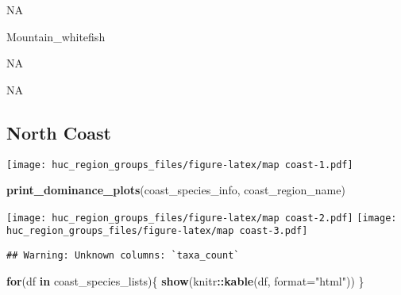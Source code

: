 \documentclass[]{article}
\newenvironment{Shaded}{\begin{snugshade}}{\end{snugshade}}
\newcommand{\KeywordTok}[1]{\textcolor[rgb]{0.13,0.29,0.53}{\textbf{#1}}}
\newcommand{\DataTypeTok}[1]{\textcolor[rgb]{0.13,0.29,0.53}{#1}}
\newcommand{\StringTok}[1]{\textcolor[rgb]{0.31,0.60,0.02}{#1}}
\newcommand{\CommentTok}[1]{\textcolor[rgb]{0.56,0.35,0.01}{\textit{#1}}}
\newcommand{\ControlFlowTok}[1]{\textcolor[rgb]{0.13,0.29,0.53}{\textbf{#1}}}
\newcommand{\OperatorTok}[1]{\textcolor[rgb]{0.81,0.36,0.00}{\textbf{#1}}}
\newcommand{\NormalTok}[1]{#1}
\begin{document}
NA

Mountain\_whitefish

NA

NA

\subsection{North Coast}\label{north-coast}

\begin{Shaded}
\end{Shaded}

\texttt{[image: huc\_region\_groups\_files/figure-latex/map coast-1.pdf]}

\begin{Shaded}
\begin{Highlighting}[]
\KeywordTok{print_dominance_plots}\NormalTok{(coast_species_info, coast_region_name)}
\end{Highlighting}
\end{Shaded}

\texttt{[image: huc\_region\_groups\_files/figure-latex/map coast-2.pdf]}
\texttt{[image: huc\_region\_groups\_files/figure-latex/map coast-3.pdf]}

\begin{Shaded}
\end{Shaded}

\begin{verbatim}
## Warning: Unknown columns: `taxa_count`
\end{verbatim}

\begin{Shaded}
\begin{Highlighting}[]
\ControlFlowTok{for}\NormalTok{(df }\ControlFlowTok{in}\NormalTok{ coast_species_lists)\{}
  \KeywordTok{show}\NormalTok{(knitr}\OperatorTok{::}\KeywordTok{kable}\NormalTok{(df, }\DataTypeTok{format=}\StringTok{"html"}\NormalTok{))}
\NormalTok{\}}
\end{Highlighting}
\end{Shaded}
\end{document}
